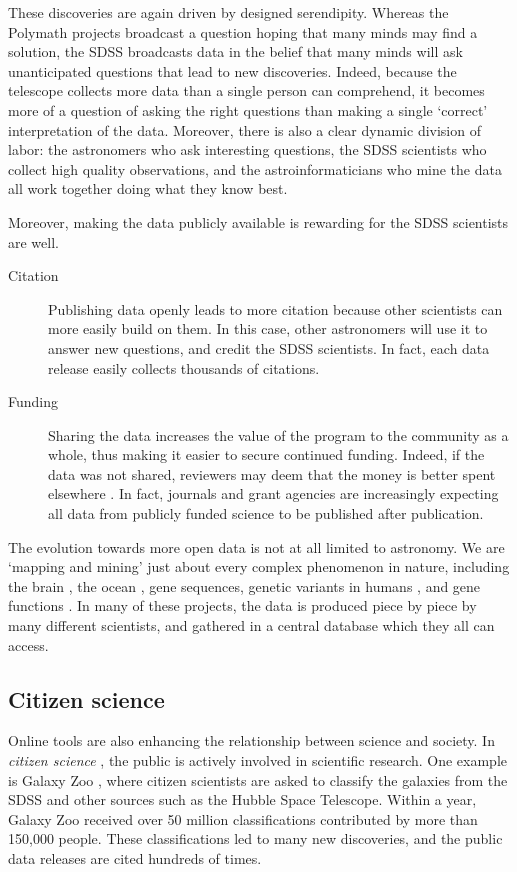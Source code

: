 \documentclass{acmproc-sp}
\begin{document}
These discoveries are again driven by designed serendipity. Whereas the Polymath projects broadcast a question hoping that many minds may find a solution, the SDSS broadcasts data in the belief that many minds will ask unanticipated questions that lead to new discoveries. Indeed, because the telescope collects more data than a single person can comprehend, it becomes more of a question of asking the right questions than making a single `correct' interpretation of the data. Moreover, there is also a clear dynamic division of labor: the astronomers who ask interesting questions, the SDSS scientists who collect high quality observations, and the astroinformaticians who mine the data all work together doing what they know best.

Moreover, making the data publicly available is rewarding for the SDSS scientists are well.
\begin{description}
\item[Citation] Publishing data openly leads to more citation because other scientists can more easily build on them. In this case, other astronomers will use it to answer new questions, and credit the SDSS scientists. In fact, each data release easily collects thousands of citations. 
\item[Funding] Sharing the data increases the value of the program to the community as a whole, thus making it easier to secure continued funding. Indeed, if the data was not shared, reviewers may deem that the money is better spent elsewhere \cite{nielsen2012reinventing}. In fact, journals and grant agencies are increasingly expecting all data from publicly funded science to be published after publication.
\end{description}

The evolution towards more open data is not at all limited to astronomy.  We are `mapping and mining' just about every complex phenomenon in nature, including the brain \cite{lein2007genome,hawrylycz2012anatomically}, the ocean \cite{isern2006ocean}, gene sequences, genetic variants in humans \cite{frazer2007second}, and gene functions \cite{parkinson2007arrayexpress}. In many of these projects, the data is produced piece by piece by many different scientists, and gathered in a central database which they all can access.

\subsection{Citizen science}
Online tools are also enhancing the relationship between science and society. In \textit{citizen science} \cite{raddick2010galaxy}, the public is actively involved in scientific research. One example is Galaxy Zoo \cite{lintott2008galaxy}, where citizen scientists are asked to classify the galaxies from the SDSS and other sources such as the Hubble Space Telescope. Within a year, Galaxy Zoo received over 50 million classifications contributed by more than 150,000 people. These classifications led to many new discoveries, and the public data releases are cited hundreds of times.
\end{document}
